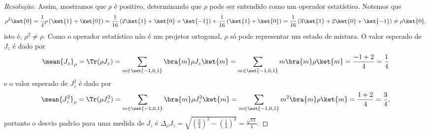\begin{proof}[Resolução]
   Assim, mostramos que \(\rho\) é positivo, determinando que \(\rho\) pode ser entendido como um operador estatístico. Notemos que
   \begin{equation*}
      \rho^2\ket{0} = \frac14 \rho \left(\ket{1} + \ket{0}\right) = \frac{1}{16}\left(2 \ket{1} + \ket{0} + \ket{-1}\right) + \frac{1}{16}\left(\ket{1} + \ket{0}\right) = \frac{1}{16}\left(3\ket{1} + 2\ket{0} + \ket{-1}\right) \neq \rho \ket{0},
   \end{equation*}
   isto é, \(\rho^2 \neq \rho\). Como o operador estatístico não é um projetor ortogonal, \(\rho\) só pode representar um estado de mistura. O valor esperado de \(J_z\) é dado por
   \begin{equation*}
      \mean{J_z}_\rho = \Tr(\rho J_z) = \sum_{m \in \set{-1, 0, 1}} \bra{m}\rho J_z \ket{m} = \sum_{m \in \set{-1,0,1}} m \bra{m}\rho\ket{m} = \frac{-1 + 2}{4} = \frac{1}{4}
   \end{equation*}
   e o valor esperado de \(J_z^2\) é dado por
   \begin{equation*}
      \mean{J_z^2}_\rho = \Tr(\rho J_z^2) = \sum_{m \in \set{-1, 0, 1}} \bra{m}\rho J_z^2 \ket{m} = \sum_{m \in \set{-1,0,1}} m^2 \bra{m}\rho\ket{m} = \frac{1 + 2}{4} = \frac{3}{4},
   \end{equation*}
   portanto o desvio padrão para uma medida de \(J_z\) é \(\Delta_\rho{J_z} = \sqrt{\left(\frac{3}{4}\right)^2 - \left(\frac{1}{4}\right)^2} = \frac{\sqrt{11}}{4}.\)
\end{proof}
